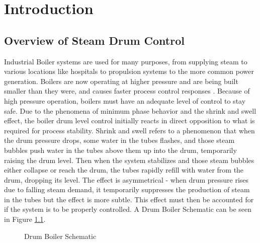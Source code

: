 \chapter{Introduction}
\section{Overview of Steam Drum Control}

Industrial Boiler systems are used for many purposes, from supplying steam to various locations like hospitals to propulsion systems to the more common power generation. Boilers are now operating at higher pressure and are being built smaller than they were, and causes faster process control responses \cite{controlguruWebsite}. Because of high pressure operation, boilers must have an adequate level of control to stay safe. Due to the phenomena of minimum phase behavior and the shrink and swell effect, the boiler drum level control initially reacts in direct opposition to what is required for process stability. Shrink and swell refers to a phenomenon that when the drum pressure drops, some water in the tubes flashes, and those steam bubbles push water in the tubes above them up into the drum, temporarily raising the drum level. Then when the system stabilizes and those steam bubbles either collapse or reach the drum, the tubes rapidly refill with water from the drum, dropping its level. The effect is asymmetrical - when drum pressure rises due to falling steam demand, it temporarily suppresses the production of steam in the tubes but the effect is more subtle. \cite{crossco} This effect must then be accounted for if the system is to be properly controlled.  A Drum Boiler Schematic can be seen in Figure \ref{fig:schematic}.


\begin{figure}[ht]
    \begin{center}
    \caption{Drum Boiler Schematic \cite{spiraxsarcoWebsite}}
    \label{fig:schematic}
    \end{center}
\end{figure}

